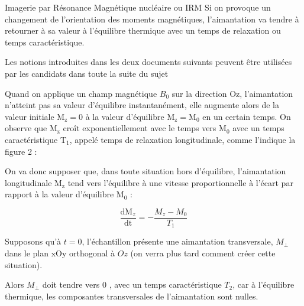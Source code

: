 \begin{exo}[PC][1][devoir]{Imagerie par Résonance Magnétique nucléaire ou IRM}
			Si on provoque un changement de l'orientation des moments magnétiques, l'aimantation va tendre à retourner à sa valeur à l'équilibre thermique avec un temps de relaxation ou temps caractéristique.

			Les notions introduites dans les deux documents suivants peuvent être utilisées par les candidats dans toute la suite du sujet

			Quand on applique un champ magnétique $B_0$ sur la direction $\mathrm{Oz}$, l'aimantation n'atteint pas sa valeur d'équilibre instantanément, elle augmente alors de la valeur initiale $\mathrm{M}_{\mathrm{z}}=0$ à la valeur d'équilibre $\mathrm{M}_{\mathrm{z}}=\mathrm{M}_{0}$ en un certain temps. On observe que $\mathrm{M}_{\mathrm{z}}$ croît exponentiellement avec le temps vers $\mathrm{M}_{0}$ avec un temps caractéristique $\mathrm{T}_{1}$, appelé temps de relaxation longitudinale, comme l'indique la figure 2 :

\begin{fig}[label]
\centering
\end{fig}

On va donc supposer que, dans toute situation hors d'équilibre, l'aimantation longitudinale $\mathrm{M}_{\mathrm{z}}$ tend vers l'équilibre à une vitesse proportionnelle à l'écart par rapport à la valeur d'équilibre $\mathrm{M}_{0}$ :

$$
\frac{\mathrm{dM}_{{z}}}{\mathrm{dt}}=-\frac{{M}_{{z}}-{M}_{0}}{T_{1}}
$$

Supposons qu'à ${t}=0$, l'échantillon présente une aimantation transversale, ${M}_{\perp}$ dans le plan $\mathrm{xOy}$ orthogonal à ${Oz}$ (on verra plus tard comment créer cette situation).

Alors ${M}_{\perp}$ doit tendre vers 0 , avec un temps caractéristique $T_{2}$, car à l'équilibre thermique, les composantes transversales de l'aimantation sont nulles.


\end{exo}
